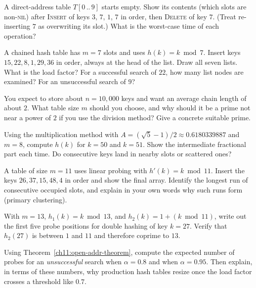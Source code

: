 \begin{exercise}
A direct-address table $T[0\,..\,9]$ starts empty. Show its contents (which slots are non-\textsc{nil}) after \textsc{Insert} of keys $3$, $7$, $1$, $7$ in order, then \textsc{Delete} of key $7$. (Treat re-inserting $7$ as overwriting its slot.) What is the worst-case time of each operation?
\end{exercise}

\begin{exercise}
A chained hash table has $m = 7$ slots and uses $h(k) = k \bmod 7$. Insert keys $15, 22, 8, 1, 29, 36$ in order, always at the head of the list. Draw all seven lists. What is the load factor? For a successful search of $22$, how many list nodes are examined? For an unsuccessful search of $9$?
\end{exercise}

\begin{exercise}
You expect to store about $n = 10{,}000$ keys and want an average chain length of about $2$. What table size $m$ should you choose, and why should it be a prime not near a power of $2$ if you use the division method? Give a concrete suitable prime.
\end{exercise}

\begin{exercise}
Using the multiplication method with $A = (\sqrt 5 - 1)/2 \approx 0.6180339887$ and $m = 8$, compute $h(k)$ for $k = 50$ and $k = 51$. Show the intermediate fractional part each time. Do consecutive keys land in nearby slots or scattered ones?
\end{exercise}

\begin{exercise}
A table of size $m = 11$ uses linear probing with $h'(k) = k \bmod 11$. Insert the keys $26, 37, 15, 48, 4$ in order and show the final array. Identify the longest run of consecutive occupied slots, and explain in your own words why such runs form (primary clustering).
\end{exercise}

\begin{exercise}
With $m = 13$, $h_1(k) = k \bmod 13$, and $h_2(k) = 1 + (k \bmod 11)$, write out the first five probe positions for double hashing of key $k = 27$. Verify that $h_2(27)$ is between $1$ and $11$ and therefore coprime to $13$.
\end{exercise}

\begin{exercise}
Using Theorem~\ref{ch11:open-addr-theorem}, compute the expected number of probes for an \emph{unsuccessful} search when $\alpha = 0.8$ and when $\alpha = 0.95$. Then explain, in terms of these numbers, why production hash tables resize once the load factor crosses a threshold like $0.7$.
\end{exercise}

